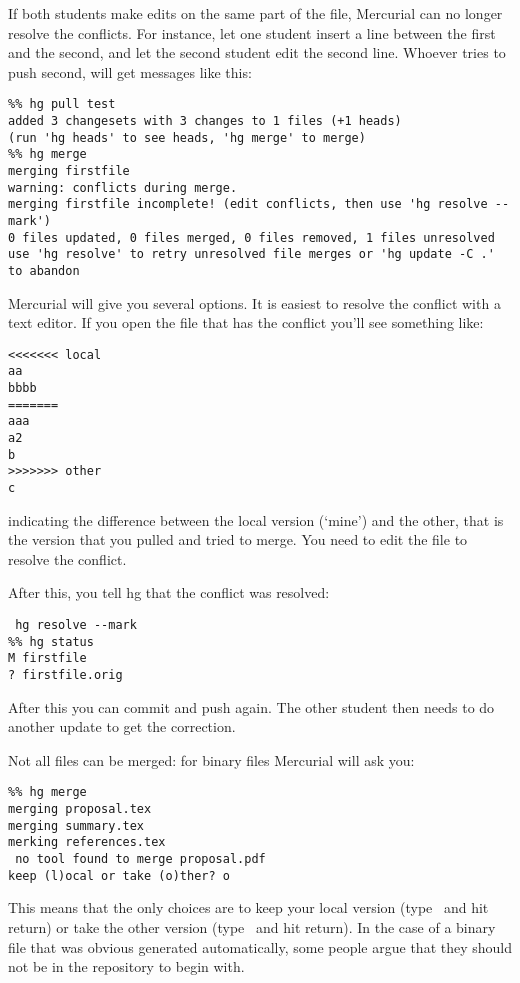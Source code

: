 
If both students make edits on the same part of the file, Mercurial can no
longer resolve the conflicts. For instance, let one student insert a
line between the first and the second, and let the second student edit
the second line. Whoever tries to push second, will get messages
like this:
\begin{verbatim}
%% hg pull test
added 3 changesets with 3 changes to 1 files (+1 heads)
(run 'hg heads' to see heads, 'hg merge' to merge)
%% hg merge
merging firstfile
warning: conflicts during merge.
merging firstfile incomplete! (edit conflicts, then use 'hg resolve --mark')
0 files updated, 0 files merged, 0 files removed, 1 files unresolved
use 'hg resolve' to retry unresolved file merges or 'hg update -C .' to abandon
\end{verbatim}
Mercurial will give you several options. It is easiest to resolve the
conflict with a text editor. If you open the file that has the conflict
you'll see something like:
\begin{verbatim}
<<<<<<< local
aa
bbbb
=======
aaa
a2
b
>>>>>>> other
c
\end{verbatim}
indicating the difference between the local version (`mine') and the
other, that is the version that you pulled and tried to merge.
You need to edit the file to resolve the conflict.

After this, you tell hg that the conflict was resolved:
\begin{verbatim}
 hg resolve --mark
%% hg status
M firstfile
? firstfile.orig
\end{verbatim}
After this you can commit and push again.
The other student then needs to do another update to get the
correction.

Not all files can be merged: for binary files Mercurial will ask you:
\begin{verbatim}
%% hg merge
merging proposal.tex
merging summary.tex
merking references.tex
 no tool found to merge proposal.pdf
keep (l)ocal or take (o)ther? o
\end{verbatim}
This means that the only choices are to keep your local version
(type~ and hit return) or take the other version (type~ and
hit return). In the case of a binary file that was obvious generated
automatically, some people argue that they should not be in the
repository to begin with.

